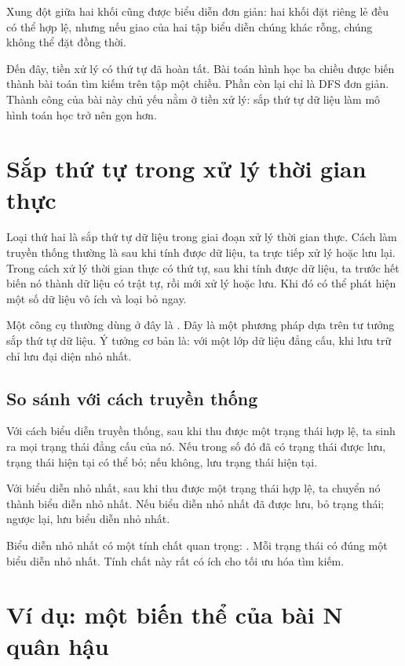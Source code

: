 \documentclass[11pt]{article}
\begin{document}
Xung đột giữa hai khối cũng được biểu diễn đơn giản: hai khối đặt riêng lẻ đều
có thể hợp lệ, nhưng nếu giao của hai tập biểu diễn chúng khác rỗng, chúng
không thể đặt đồng thời.

Đến đây, tiền xử lý có thứ tự đã hoàn tất. Bài toán hình học ba chiều được
biến thành bài toán tìm kiếm trên tập một chiều. Phần còn lại chỉ là DFS đơn
giản. Thành công của bài này chủ yếu nằm ở tiền xử lý: sắp thứ tự dữ liệu làm
mô hình toán học trở nên gọn hơn.

\section{Sắp thứ tự trong xử lý thời gian thực}

Loại thứ hai là sắp thứ tự dữ liệu trong giai đoạn xử lý thời gian thực. Cách
làm truyền thống thường là sau khi tính được dữ liệu, ta trực tiếp xử lý hoặc
lưu lại. Trong cách xử lý thời gian thực có thứ tự, sau khi tính được dữ liệu,
ta trước hết biến nó thành dữ liệu có trật tự, rồi mới xử lý hoặc lưu. Khi đó
có thể phát hiện một số dữ liệu vô ích và loại bỏ ngay.

Một công cụ thường dùng ở đây là . Đây là một phương
pháp dựa trên tư tưởng sắp thứ tự dữ liệu. Ý tưởng cơ bản là: với một lớp dữ
liệu đẳng cấu, khi lưu trữ chỉ lưu đại diện nhỏ nhất.

\subsection{So sánh với cách truyền thống}

Với cách biểu diễn truyền thống, sau khi thu được một trạng thái hợp lệ, ta
sinh ra mọi trạng thái đẳng cấu của nó. Nếu trong số đó đã có trạng thái được
lưu, trạng thái hiện tại có thể bỏ; nếu không, lưu trạng thái hiện tại.

Với biểu diễn nhỏ nhất, sau khi thu được một trạng thái hợp lệ, ta chuyển nó
thành biểu diễn nhỏ nhất. Nếu biểu diễn nhỏ nhất đã được lưu, bỏ trạng thái;
ngược lại, lưu biểu diễn nhỏ nhất.

Biểu diễn nhỏ nhất có một tính chất quan trọng: . Mỗi trạng
thái có đúng một biểu diễn nhỏ nhất. Tính chất này rất có ích cho tối ưu hóa
tìm kiếm.

\section{Ví dụ: một biến thể của bài N quân hậu}
\end{document}
